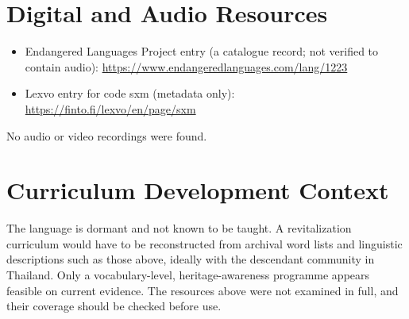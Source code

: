 \documentclass[12pt]{article}
\begin{document}
\section{Digital and Audio Resources}
\begin{itemize}
\item Endangered Languages Project entry (a catalogue record; not verified to contain audio): \url{https://www.endangeredlanguages.com/lang/1223}
\item Lexvo entry for code sxm (metadata only): \url{https://finto.fi/lexvo/en/page/sxm}
\end{itemize}
No audio or video recordings were found.

\section{Curriculum Development Context}
The language is dormant and not known to be taught. A revitalization curriculum would have to be reconstructed from archival word lists and linguistic descriptions such as those above, ideally with the descendant community in Thailand. Only a vocabulary-level, heritage-awareness programme appears feasible on current evidence. The resources above were not examined in full, and their coverage should be checked before use.
\end{document}
